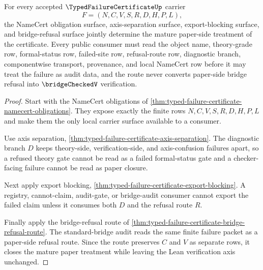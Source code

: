 \begin{theorem}
\label{thm:typed-failure-certificate-mature-treatment-route}
For every accepted $\TypedFailureCertificateUp$ carrier
$$
F=(N,C,V,S,R,D,H,P,L),
$$
the NameCert obligation surface, axis-separation surface, export-blocking surface, and bridge-refusal surface jointly determine the mature paper-side treatment of the certificate. Every public consumer must read the object name, theory-grade row, formal-status row, failed-site row, refusal-route row, diagnostic branch, componentwise transport, provenance, and local NameCert row before it may treat the failure as audit data, and the route never converts paper-side bridge refusal into $\bridgeCheckedV$ verification.
\end{theorem}
\begin{proof}
Start with the NameCert obligations of \autoref{thm:typed-failure-certificate-namecert-obligations}. They expose exactly the finite rows $N,C,V,S,R,D,H,P,L$ and make them the only local carrier surface available to a consumer.

Use axis separation, \autoref{thm:typed-failure-certificate-axis-separation}. The diagnostic branch $D$ keeps theory-side, verification-side, and axis-confusion failures apart, so a refused theory gate cannot be read as a failed formal-status gate and a checker-facing failure cannot be read as paper closure.

Next apply export blocking, \autoref{thm:typed-failure-certificate-export-blocking}. A registry, cannot-claim, audit-gate, or bridge-audit consumer cannot export the failed claim unless it consumes both $D$ and the refusal route $R$.

Finally apply the bridge-refusal route of \autoref{thm:typed-failure-certificate-bridge-refusal-route}. The standard-bridge audit reads the same finite failure packet as a paper-side refusal route. Since the route preserves $C$ and $V$ as separate rows, it closes the mature paper treatment while leaving the Lean verification axis unchanged.
\end{proof}



